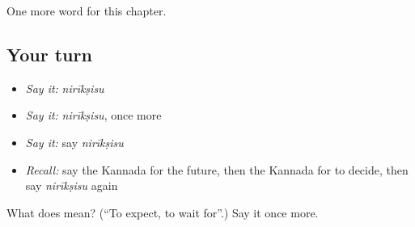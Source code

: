 \begin{grammarlens}[title={What you've built}]
One more word for this chapter.
\end{grammarlens}

\subsection*{Your turn}
\begin{itemize}
\raggedright
  \item \emph{Say it:} \emph{nirīkṣisu}
  \item \emph{Say it:} \emph{nirīkṣisu}, once more
  \item \emph{Say it:} say \emph{nirīkṣisu}
  \item \emph{Recall:} say the Kannada for the future, then the Kannada for to decide, then say \emph{nirīkṣisu} again
\end{itemize}

\begin{tcolorbox}[breakable,colback=teal!4,colframe=teal!35!black,title={Before you move on}]
What does  mean? (\textquotedblleft{}To expect, to wait for\textquotedblright{}.) Say it once more.
\end{tcolorbox}
